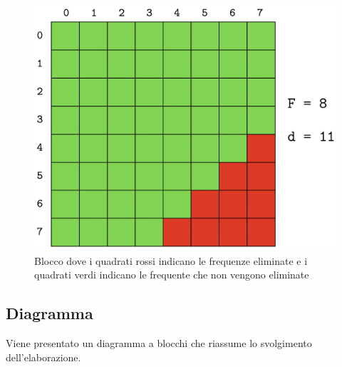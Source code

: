 \documentclass[preprint,12pt]{elsarticle}
\begin{document}
\begin{figure}[h]
	\centering
	\includegraphics[width=0.5\linewidth]{esempio}
	\caption{Blocco dove i quadrati rossi indicano le frequenze eliminate e i quadrati verdi indicano le frequente che non vengono eliminate}
\end{figure}


\subsection*{Diagramma}
Viene presentato un diagramma a blocchi che riassume lo svolgimento dell'elaborazione.
\vspace{5mm}
\end{document}
